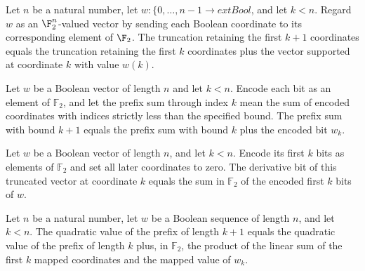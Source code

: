 \begin{theorem}
\label{FABL.completeQuadraticTruncation_succ}
\leanok
{}
Let $n$ be a natural number, let $w:\{0,\ldots,n-1\rightarrow	ext{Bool}$, and let $k<n$.
Regard $w$ as an $\F_2^n$-valued vector by sending each Boolean coordinate to its
corresponding element of $\F_2$. The truncation retaining the first $k+1$ coordinates
equals the truncation retaining the first $k$ coordinates plus the vector supported at
coordinate $k$ with value $w(k)$.
\end{theorem}

\begin{theorem}
\label{FABL.completeQuadraticLinearPrefixBit_succ}
\leanok
{}
Let $w$ be a Boolean vector of length $n$ and let $k<n$. Encode each bit as an element
of $\mathbb{F}_2$, and let the prefix sum through index $k$ mean the sum of encoded
coordinates with indices strictly less than the specified bound. The prefix sum with
bound $k+1$ equals the prefix sum with bound $k$ plus the encoded bit $w_k$.
\end{theorem}

\begin{theorem}
\label{FABL.completeQuadraticDerivativeBit_truncation}
\leanok
{}
Let $w$ be a Boolean vector of length $n$, and let $k<n$. Encode its first $k$ bits as
elements of $\mathbb{F}_2$ and set all later coordinates to zero. The derivative bit of
this truncated vector at coordinate $k$ equals the sum in $\mathbb{F}_2$ of the encoded
first $k$ bits of $w$.
\end{theorem}

\begin{theorem}
\label{FABL.completeQuadraticPrefixBit_succ}
\leanok
{}
Let $n$ be a natural number, let $w$ be a Boolean sequence of length $n$, and let $k<n$.
The quadratic value of the prefix of length $k+1$ equals the quadratic value of the
prefix of length $k$ plus, in $\mathbb F_2$, the product of the linear sum of the first
$k$ mapped coordinates and the mapped value of $w_k$.
\end{theorem}

